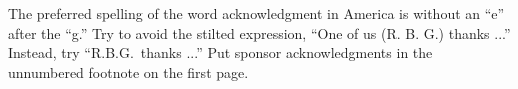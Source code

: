 \documentclass{article}
\begin{document}
\begin{sloppy}
The preferred spelling of the word acknowledgment in 
America is without an ``e'' after the ``g.'' Try to avoid 
the stilted expression, ``One of us (R. B. G.) thanks ...''
Instead, try ``R.B.G.\ thanks ...''  Put sponsor 
acknowledgments in the unnumbered footnote on the first page.



%
% 
%
%
%
% 
%
% 
% 


\end{sloppy}
\end{document}
